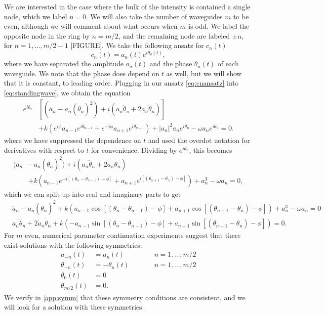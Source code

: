 \documentclass[11pt,reqno]{amsart}
\begin{document}
We are interested in the case where the bulk of the intensity is contained a single node, which we label $n=0$. We will also take the number of waveguides $m$ to be even, although we will comment about what occurs when $m$ is odd. We label the opposite node in the ring by $n=m/2$, and the remaining node are labeled $\pm n$, for $n = 1, \dots, m/2-1$ [FIGURE]. We take the following ansatz for $c_n(t)$
\begin{equation}\label{eq:cnansatz}
c_n(t) = a_n(t)e^{i \theta_n(t)},
\end{equation}
where we have separated the amplitude $a_n(t)$ and the phase $\theta_n(t)$ of each waveguide. We note that the phase does depend on $t$ as well, but we will show that it is constant, to leading order. Plugging in our ansatz \cref{eq:cnansatz} into \cref{eq:standingwave}, we obtain the equation
\begin{align*}
e^{i \theta_n}&\left[ (\ddot a_n - a_n (\dot \theta_n)^2) 
+ i ( a_n \ddot\theta_n + 2 \dot a_n \dot \theta_n ) \right] \\
&+ k\left(e^{i\phi}a_{n-1}e^{i \theta_{n-1}} +e^{-i\phi}a_{n+1}e^{i \theta_{n+1}}\right)+|a_n|^2 a_n e^{i \theta_n} - \omega a_n e^{i \theta_n} = 0.
\end{align*}
where we have suppressed the dependence on $t$ and used the overdot notation for derivatives with respect to $t$ for convenience. Dividing by $e^{i \theta_n}$, this becomes
\begin{equation}\label{eq:st2}
\begin{aligned}
(\ddot a_n &- a_n (\dot \theta_n)^2) 
+ i ( a_n \ddot\theta_n + 2 \dot a_n \dot \theta_n )\\
&+ k\left(a_{n-1}e^{-i[(\theta_n - \theta_{n-1}) - \phi]} + a_{n+1}e^{i[(\theta_{n+1} - \theta_{n}) - \phi]} \right)+a_n^3 - \omega a_n = 0,
\end{aligned}
\end{equation}	
which we can split up into real and imaginary parts to get
\begin{align}
&\ddot a_n - a_n (\dot \theta_n)^2 +
 k\left(a_{n-1}\cos[(\theta_n - \theta_{n-1}) - \phi] + a_{n+1}\cos[(\theta_{n+1} - \theta_{n}) - \phi] \right)+a_n^3 - \omega a_n = 0 \label{eq:st2real} \\
&a_n \ddot\theta_n + 2 \dot a_n \dot \theta_n
+ k\left(-a_{n-1}\sin[(\theta_n - \theta_{n-1}) - \phi] + a_{n+1}\sin [(\theta_{n+1} - \theta_{n}) - \phi] \right) = 0. \label{eq:st2imag}
\end{align}
For $m$ even, numerical parameter continuation experiments suggest that there exist solutions with the following symmetries:
\begin{equation}\label{eq:symm}
\begin{aligned}
a_{-n}(t) &= a_{n}(t) && \qquad n = 1, \dots, m/2 \\
\theta_{-n}(t) &= -\theta_{n}(t) && \qquad n = 1, \dots, m/2 \\
\theta_0(t) &= 0 \\
\theta_{m/2}(t) &= 0.
\end{aligned}
\end{equation}
We verify in \cref{app:symm} that these symmetry conditions are consistent, and we will look for a solution with these symmetries. 
\end{document}

